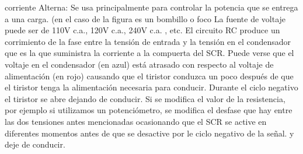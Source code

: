 \documentclass[12pt]{article}
\begin{document}
corriente Alterna:
Se usa principalmente para controlar la potencia que se entrega a una carga. (en el caso de la figura es un bombillo o foco
La fuente de voltaje puede ser de 110V c.a., 120V c.a., 240V c.a. , etc.
El circuito RC produce un corrimiento de la fase entre la tensión de entrada y la tensión en el condensador que es la que suministra la corriente a la compuerta del SCR. Puede verse que el voltaje en el condensador (en azul) está atrasado con respecto al voltaje de alimentación (en rojo) causando que el tiristor conduzca un poco después de que el tiristor tenga la alimentación necesaria para conducir. 
Durante el ciclo negativo el tiristor se abre dejando de conducir. Si se modifica el valor de la resistencia, por ejemplo si utilizamos un potenciómetro, se modifica el desfase que hay entre las dos tensiones antes mencionadas ocasionando que el SCR se active en diferentes momentos antes de que se desactive por le ciclo negativo de la señal. y deje de conducir.
\end{document}
